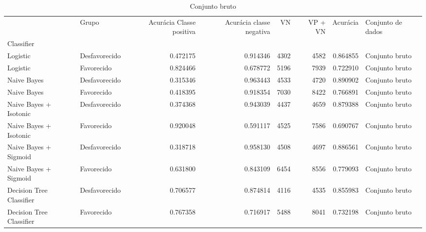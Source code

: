 \begin{table}
\centering
\caption{Conjunto bruto}
\label{Conjunto bruto 3}
\begin{tabular}{llrrrrrl}
\toprule
{} &          Grupo &  Acurácia Classe positiva &  Acurácia classe negativa &   VN  &  VP + VN  &  Acurácia & Conjunto de dados \\
Classifier               &                &                           &                           &       &           &           &                   \\
\midrule
Logistic                 &  Desfavorecido &                  0.472175 &                  0.914346 &  4302 &      4582 &  0.864855 &    Conjunto bruto \\
Logistic                 &     Favorecido &                  0.824466 &                  0.678772 &  5196 &      7939 &  0.722910 &    Conjunto bruto \\
Naive Bayes              &  Desfavorecido &                  0.315346 &                  0.963443 &  4533 &      4720 &  0.890902 &    Conjunto bruto \\
Naive Bayes              &     Favorecido &                  0.418395 &                  0.918354 &  7030 &      8422 &  0.766891 &    Conjunto bruto \\
Naive Bayes + Isotonic   &  Desfavorecido &                  0.374368 &                  0.943039 &  4437 &      4659 &  0.879388 &    Conjunto bruto \\
Naive Bayes + Isotonic   &     Favorecido &                  0.920048 &                  0.591117 &  4525 &      7586 &  0.690767 &    Conjunto bruto \\
Naive Bayes + Sigmoid    &  Desfavorecido &                  0.318718 &                  0.958130 &  4508 &      4697 &  0.886561 &    Conjunto bruto \\
Naive Bayes + Sigmoid    &     Favorecido &                  0.631800 &                  0.843109 &  6454 &      8556 &  0.779093 &    Conjunto bruto \\
Decision Tree Classifier &  Desfavorecido &                  0.706577 &                  0.874814 &  4116 &      4535 &  0.855983 &    Conjunto bruto \\
Decision Tree Classifier &     Favorecido &                  0.767358 &                  0.716917 &  5488 &      8041 &  0.732198 &    Conjunto bruto \\
\bottomrule
\end{tabular}
\end{table}
